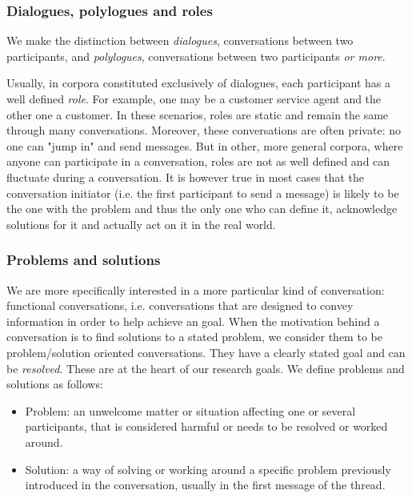 \documentclass[11pt]{article}
\begin{document}
\subsubsection{Dialogues, polylogues and roles}

We make the distinction between \textit{dialogues}, conversations between two participants, and \textit{polylogues}, conversations between two participants \textit{or more}. 

Usually, in corpora constituted exclusively of dialogues, each participant has a well defined \textit{role}. For example, one may be a customer service agent and the other one a customer. In these scenarios, roles are static and remain the same through many conversations. Moreover, these conversations are often private: no one can "jump in" and send messages. But in other, more general corpora, where anyone can participate in a conversation, roles are not as well defined and can fluctuate during a conversation. It is however true in most cases that the conversation initiator (i.e. the first participant to send a message) is likely to be the one with the problem and thus the only one who can define it, acknowledge solutions for it and actually act on it in the real world.

\subsubsection{Problems and solutions}

We are more specifically interested in a more particular kind of conversation: functional conversations, i.e. conversations that are designed to convey information in order to help achieve an goal. When the motivation behind a conversation is to find solutions to a stated problem, we consider them to be problem/solution oriented conversations. They have a clearly stated goal and can be \textit{resolved}. These are at the heart of our research goals.
\newline
\newline
We define problems and solutions as follows:

\begin{itemize}
	\item Problem: an unwelcome matter or situation affecting one or several participants, that is considered harmful or needs to be resolved or worked around.
	\item Solution: a way of solving or working around a specific problem previously introduced in the conversation, usually in the first message of the thread.
\end{itemize}
\end{document}
